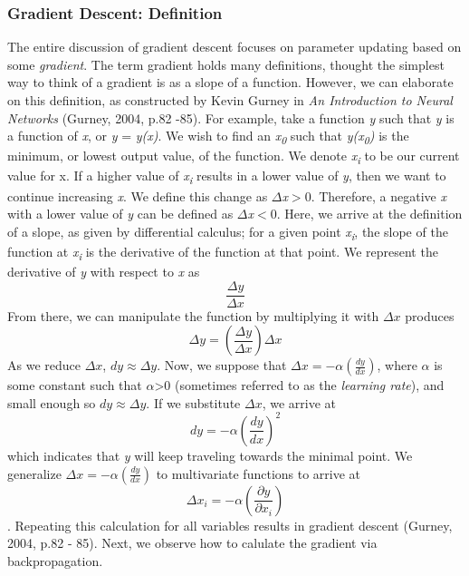 \documentclass[11pt]{article}
\begin{document}
\subsubsection{Gradient Descent: Definition}
The entire discussion of gradient descent focuses on parameter updating based on some \textit{gradient}. The term gradient holds many definitions, thought the simplest way to think of a gradient is as a slope of a function. However, we can elaborate on this definition, as constructed by Kevin Gurney in \textit{An Introduction to Neural Networks} (Gurney, 2004, p.82 -85). For example, take a function \textit{y} such that \textit{y} is a function of \textit{x}, or \textit{y} = \textit{y(x)}. We wish to find an \textit{x\textsubscript{0}} such that \textit{y(x\textsubscript{0})} is the minimum, or lowest output value, of the function. We denote \textit{x\textsubscript{i}} to be our current value for x. If a higher value of \textit{x\textsubscript{i}} results in a lower value of \textit{y}, then we want to continue increasing \textit{x}. We define this change as $\Delta$\textit{x}$>$0. Therefore, a negative \textit{x} with a lower value of \textit{y} can be defined as $\Delta$\textit{x}$<$0. Here, we arrive at the definition of a slope, as given by differential calculus; for a given point \textit{x\textsubscript{i}}, the slope of the function at \textit{x\textsubscript{i}} is the derivative of the function at that point. We represent the derivative of \textit{y} with respect to \textit{x} as $$\frac{\Delta y}{\Delta x}$$ From there, we can manipulate the function by multiplying it with $\Delta x$ produces $$\Delta y = (\frac{\Delta y}{\Delta x})\Delta x$$ As we reduce $\Delta x$, $dy \approx \Delta y$. Now, we suppose that $\Delta x = -\alpha(\frac{dy}{dx}) $, where $\alpha$ is some constant such that $\alpha$>0 (sometimes referred to as the \textit{learning rate}), and small enough so $dy \approx \Delta y$. If we substitute $\Delta x$, we arrive at $$ dy = -\alpha(\frac{dy}{dx})^{2}$$ which indicates that \textit{y} will keep traveling towards the minimal point. We generalize $\Delta x = -\alpha(\frac{dy}{dx}) $ to multivariate functions to arrive at $$\Delta x_i = -\alpha(\frac{\partial y}{\partial x_i})$$. Repeating this calculation for all variables results in gradient descent (Gurney, 2004, p.82 - 85). Next, we observe how to calulate the gradient via backpropagation.
\end{document}
